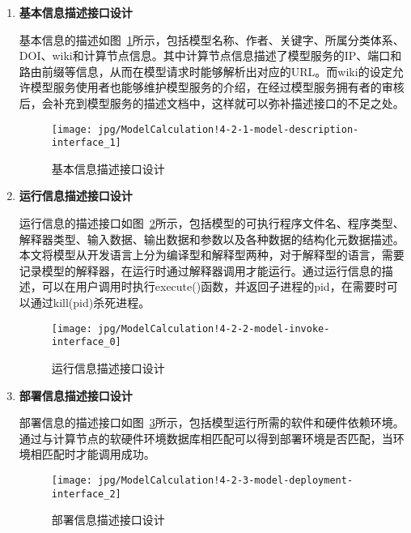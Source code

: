 \begin{enumerate}[(1)]
\item \textbf{基本信息描述接口设计}

基本信息的描述如图~\ref{fig:ModelCalculation!4-2-1-model-description-interface_1}所示，包括模型名称、作者、关键字、所属分类体系、DOI、wiki和计算节点信息。其中计算节点信息描述了模型服务的IP、端口和路由前缀等信息，从而在模型请求时能够解析出对应的URL。而wiki的设定允许模型服务使用者也能够维护模型服务的介绍，在经过模型服务拥有者的审核后，会补充到模型服务的描述文档中，这样就可以弥补描述接口的不足之处。

\begin{figure}[!htbp]
    \centering
    \texttt{[image: jpg/ModelCalculation!4-2-1-model-description-interface\_1]}
    \caption{基本信息描述接口设计}
    \label{fig:ModelCalculation!4-2-1-model-description-interface_1}
\end{figure}

\item \textbf{运行信息描述接口设计}
\label{sec:io-interface}

运行信息的描述接口如图~\ref{fig:ModelCalculation!4-2-2-model-invoke-interface_0}所示，包括模型的可执行程序文件名、程序类型、解释器类型、输入数据、输出数据和参数以及各种数据的结构化元数据描述。本文将模型从开发语言上分为编译型和解释型两种，对于解释型的语言，需要记录模型的解释器，在运行时通过解释器调用才能运行。通过运行信息的描述，可以在用户调用时执行execute()函数，并返回子进程的pid，在需要时可以通过kill(pid)杀死进程。

\begin{figure}[!htbp]
    \centering
    \texttt{[image: jpg/ModelCalculation!4-2-2-model-invoke-interface\_0]}
    \caption{运行信息描述接口设计}
    \label{fig:ModelCalculation!4-2-2-model-invoke-interface_0}
\end{figure}

\item \textbf{部署信息描述接口设计}

部署信息的描述接口如图~\ref{fig:ModelCalculation!4-2-3-model-deployment-interface_2}所示，包括模型运行所需的软件和硬件依赖环境。通过与计算节点的软硬件环境数据库相匹配可以得到部署环境是否匹配，当环境相匹配时才能调用成功。

\begin{figure}[!htbp]
    \centering
    \texttt{[image: jpg/ModelCalculation!4-2-3-model-deployment-interface\_2]}
    \caption{部署信息描述接口设计}
    \label{fig:ModelCalculation!4-2-3-model-deployment-interface_2}
\end{figure}
\end{enumerate}

